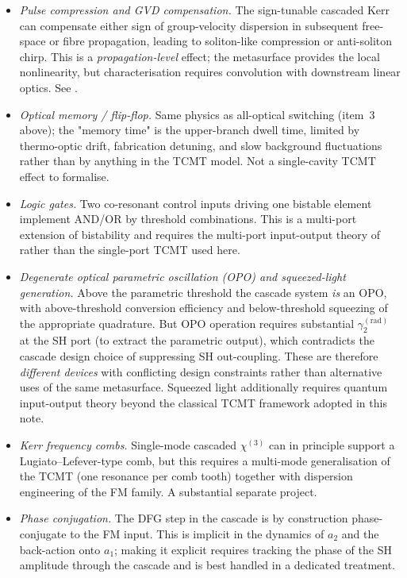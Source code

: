 \documentclass[11pt,a4paper]{article}
\newcommand{\chithree}{\chi^{(3)}}
\begin{document}
\begin{itemize}\setlength{\itemsep}{2pt}
  \item \emph{Pulse compression and GVD compensation.}  The
    sign-tunable cascaded Kerr can compensate either sign of
    group-velocity dispersion in subsequent free-space or fibre
    propagation, leading to soliton-like compression or anti-soliton
    chirp.  This is a \emph{propagation-level} effect; the metasurface
    provides the local nonlinearity, but characterisation requires
    convolution with downstream linear optics.  See \cite{Liu1999,Bache2007}.

  \item \emph{Optical memory / flip-flop.}  Same physics as
    all-optical switching (item~3 above); the "memory time" is the
    upper-branch dwell time, limited by thermo-optic drift,
    fabrication detuning, and slow background fluctuations rather than
    by anything in the TCMT model.  Not a single-cavity TCMT effect to
    formalise.

  \item \emph{Logic gates.}  Two co-resonant control inputs driving
    one bistable element implement AND/OR by threshold combinations.
    This is a multi-port extension of bistability and requires the
    multi-port input-output theory of \cite{SuhWangFan2004} rather
    than the single-port TCMT used here.

  \item \emph{Degenerate optical parametric oscillation (OPO) and
    squeezed-light generation.}  Above the parametric threshold the
    cascade system \emph{is} an OPO, with above-threshold conversion
    efficiency and below-threshold squeezing of the appropriate
    quadrature.  But OPO operation requires substantial
    $\gamma_2^{(\text{rad})}$ at the SH port (to extract the
    parametric output), which contradicts the cascade design choice
    of suppressing SH out-coupling.  These are therefore
    \emph{different devices} with conflicting design constraints
    rather than alternative uses of the same metasurface.  Squeezed
    light additionally requires quantum input-output theory beyond the
    classical TCMT framework adopted in this note.

  \item \emph{Kerr frequency combs.}  Single-mode cascaded $\chithree$
    can in principle support a Lugiato--Lefever-type comb, but this
    requires a multi-mode generalisation of the TCMT (one resonance
    per comb tooth) together with dispersion engineering of the FM
    family.  A substantial separate project.

  \item \emph{Phase conjugation.}  The DFG step in the cascade is by
    construction phase-conjugate to the FM input.  This is implicit in
    the dynamics of $a_2$ and the back-action onto $a_1$; making it
    explicit requires tracking the phase of the SH amplitude through
    the cascade and is best handled in a dedicated treatment.
\end{itemize}
\end{document}
